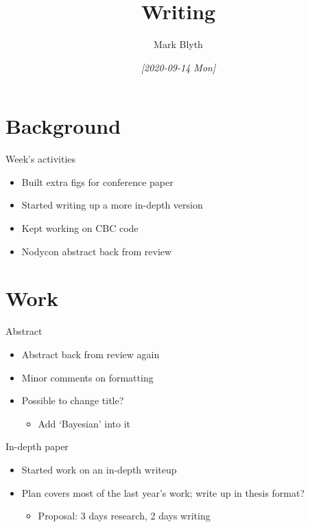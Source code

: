 \documentclass[presentation]{beamer}
\author{Mark Blyth}
\date{\textit{[2020-09-14 Mon]}}
\title{Writing}
\begin{document}
\maketitle

\section{Background}
\label{sec:org2d064ae}
\begin{frame}[label={sec:orgf503ebc}]{Week's activities}
\begin{itemize}
\item Built extra figs for conference paper
\item Started writing up a more in-depth version
\item Kept working on CBC code
\item Nodycon abstract back from review
\end{itemize}
\end{frame}


\section{Work}
\label{sec:org93b5058}
\begin{frame}[label={sec:orgb60dc06}]{Abstract}
\begin{itemize}
\item Abstract back from review again
\vfill
\item Minor comments on formatting
\vfill
\item Possible to change title?
\begin{itemize}
\item Add `Bayesian' into it
\end{itemize}
\end{itemize}
\end{frame}

\begin{frame}[label={sec:org3efc895}]{In-depth paper}
\begin{itemize}
\item Started work on an in-depth writeup
\vfill
\item Plan covers most of the last year's work; write up in thesis format?
\begin{itemize}
\item Proposal: 3 days research, 2 days writing
\end{itemize}
\end{itemize}
\end{frame}
\end{document}
